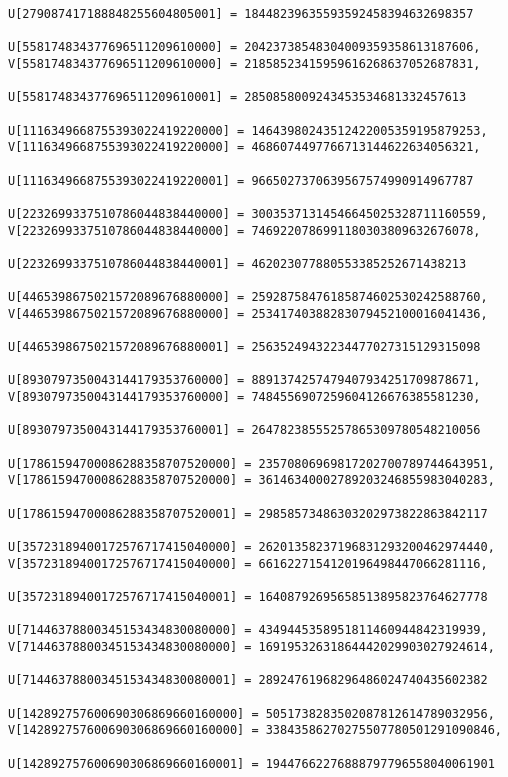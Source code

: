 \documentclass[a4paper]{article}
\begin{document}
\begin{verbatim}
U[279087417188848255604805001] = 18448239635593592458394632698357

U[558174834377696511209610000] = 20423738548304009359358613187606, 
V[558174834377696511209610000] = 21858523415959616268637052687831, 

U[558174834377696511209610001] = 2850858009243453534681332457613

U[1116349668755393022419220000] = 14643980243512422005359195879253, 
V[1116349668755393022419220000] = 4686074497766713144622634056321, 

U[1116349668755393022419220001] = 9665027370639567574990914967787

U[2232699337510786044838440000] = 30035371314546645025328711160559, 
V[2232699337510786044838440000] = 7469220786991180303809632676078, 

U[2232699337510786044838440001] = 462023077880553385252671438213

U[4465398675021572089676880000] = 25928758476185874602530242588760, 
V[4465398675021572089676880000] = 25341740388283079452100016041436, 

U[4465398675021572089676880001] = 25635249432234477027315129315098

U[8930797350043144179353760000] = 8891374257479407934251709878671, 
V[8930797350043144179353760000] = 7484556907259604126676385581230, 

U[8930797350043144179353760001] = 26478238555257865309780548210056

U[17861594700086288358707520000] = 23570806969817202700789744643951, 
V[17861594700086288358707520000] = 36146340002789203246855983040283, 

U[17861594700086288358707520001] = 29858573486303202973822863842117

U[35723189400172576717415040000] = 26201358237196831293200462974440, 
V[35723189400172576717415040000] = 6616227154120196498447066281116, 

U[35723189400172576717415040001] = 16408792695658513895823764627778

U[71446378800345153434830080000] = 4349445358951811460944842319939, 
V[71446378800345153434830080000] = 16919532631864442029903027924614, 

U[71446378800345153434830080001] = 28924761968296486024740435602382

U[142892757600690306869660160000] = 5051738283502087812614789032956, 
V[142892757600690306869660160000] = 33843586270275507780501291090846, 

U[142892757600690306869660160001] = 19447662276888797796558040061901


\end{verbatim}
\end{document}
